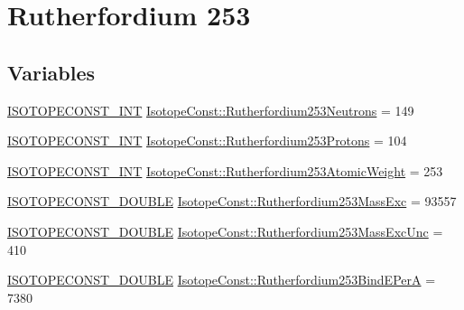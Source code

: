 \hypertarget{group___isotope_const-_rutherfordium-_rf253}{}\section{Rutherfordium 253}
\label{group___isotope_const-_rutherfordium-_rf253}
\subsection*{Variables}
\begin{DoxyCompactItemize}
\item 
\mbox{\hyperlink{group___isotope_const-_macros_ga5f18360b3e99483a35c32d789e62621c}{I\+S\+O\+T\+O\+P\+E\+C\+O\+N\+S\+T\+\_\+\+I\+NT}} \mbox{\hyperlink{group___isotope_const-_rutherfordium-_rf253_ga027e89d7fe21fb44fd285bcb48f2f746}{Isotope\+Const\+::\+Rutherfordium253\+Neutrons}} = 149
\item 
\mbox{\hyperlink{group___isotope_const-_macros_ga5f18360b3e99483a35c32d789e62621c}{I\+S\+O\+T\+O\+P\+E\+C\+O\+N\+S\+T\+\_\+\+I\+NT}} \mbox{\hyperlink{group___isotope_const-_rutherfordium-_rf253_gafb570610998425a135be74d7b99863c2}{Isotope\+Const\+::\+Rutherfordium253\+Protons}} = 104
\item 
\mbox{\hyperlink{group___isotope_const-_macros_ga5f18360b3e99483a35c32d789e62621c}{I\+S\+O\+T\+O\+P\+E\+C\+O\+N\+S\+T\+\_\+\+I\+NT}} \mbox{\hyperlink{group___isotope_const-_rutherfordium-_rf253_ga9869898ea2400dd6d6688373ab0620bf}{Isotope\+Const\+::\+Rutherfordium253\+Atomic\+Weight}} = 253
\item 
\mbox{\hyperlink{group___isotope_const-_macros_ga8f45a7272ce02c0b4c65c44636ed719a}{I\+S\+O\+T\+O\+P\+E\+C\+O\+N\+S\+T\+\_\+\+D\+O\+U\+B\+LE}} \mbox{\hyperlink{group___isotope_const-_rutherfordium-_rf253_ga00d3d033aac717e0e00fa9b303866465}{Isotope\+Const\+::\+Rutherfordium253\+Mass\+Exc}} = 93557
\item 
\mbox{\hyperlink{group___isotope_const-_macros_ga8f45a7272ce02c0b4c65c44636ed719a}{I\+S\+O\+T\+O\+P\+E\+C\+O\+N\+S\+T\+\_\+\+D\+O\+U\+B\+LE}} \mbox{\hyperlink{group___isotope_const-_rutherfordium-_rf253_ga956b23ff545d6ef256f27651942c6960}{Isotope\+Const\+::\+Rutherfordium253\+Mass\+Exc\+Unc}} = 410
\item 
\mbox{\hyperlink{group___isotope_const-_macros_ga8f45a7272ce02c0b4c65c44636ed719a}{I\+S\+O\+T\+O\+P\+E\+C\+O\+N\+S\+T\+\_\+\+D\+O\+U\+B\+LE}} \mbox{\hyperlink{group___isotope_const-_rutherfordium-_rf253_ga3da7601ddedf79bc03329d0e7fd3fca7}{Isotope\+Const\+::\+Rutherfordium253\+Bind\+E\+PerA}} = 7380

\end{DoxyCompactItemize}
